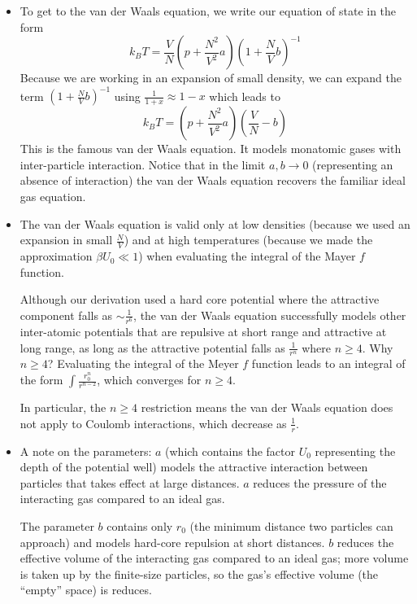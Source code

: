 \documentclass[11pt, a4paper]{article}
\begin{document}
\begin{itemize}
	\item To get to the van der Waals equation, we write our equation of state in the form 
	\begin{equation*}
		k_{B}T = \frac{V}{N}\left(p + \frac{N^{2}}{V^{2}}a\right)\left(1 + \frac{N}{V}b\right)^{-1}
	\end{equation*}
	Because we are working in an expansion of small density, we can expand the term $ \left(1 + \frac{N}{V}b\right)^{-1} $ using $ \frac{1}{1+x} \approx 1 - x $ which leads to
	\begin{equation*}
		k_{B}T = \left(p + \frac{N^{2}}{V^{2}}a\right)\left(\frac{V}{N} - b\right)
	\end{equation*}
	This is the famous van der Waals equation. It models monatomic gases with inter-particle interaction. Notice that in the limit $ a, b \to 0 $ (representing an absence of interaction) the van der Waals equation recovers the familiar ideal gas equation.
	
	\item The van der Waals equation is valid only at low densities (because we used an expansion in small $ \frac{N}{V} $) and at high temperatures (because we made the approximation $ \beta U_{0} \ll 1 $) when evaluating the integral of the Mayer $ f $ function.
	
	Although our derivation used a hard core potential where the attractive component falls as $ \sim \frac{1}{r^{6}} $, the van der Waals equation successfully models other inter-atomic potentials that are repulsive at short range and attractive at long range, as long as the attractive potential falls as $ \frac{1}{r^{n}} $ where $ n \geq 4 $. Why $ n \geq 4 $? Evaluating the integral of the Meyer $ f $ function leads to an integral of the form $ \int \frac{r_{0}^{n}}{r^{n-2}} $, which converges for $ n \geq 4 $.
	
	In particular, the $ n \geq 4 $ restriction means the van der Waals equation does not apply to Coulomb interactions, which decrease as $ \frac{1}{r} $.
	
	\item A note on the parameters: $ a $ (which contains the factor $ U_{0} $ representing the depth of the potential well) models the attractive interaction between particles that takes effect at large distances. $ a $ reduces the pressure of the interacting gas compared to an ideal gas.
	
	The parameter $ b $ contains only $ r_{0} $ (the minimum distance two particles can approach) and models hard-core repulsion at short distances. $ b $ reduces the effective volume of the interacting gas compared to an ideal gas; more volume is taken up by the finite-size particles, so the gas's effective volume (the ``empty'' space) is reduces. 

\end{itemize}
\end{document}
